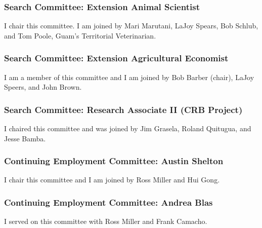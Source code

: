 \documentclass[12pt,english]{scrartcl}
\begin{document}
\subsubsection{Search Committee: Extension Animal Scientist}

I chair this committee. I am joined by Mari Marutani, LaJoy Spears,
Bob Schlub, and Tom Poole, Guam's Territorial Veterinarian.

\begin{comment}

\raggedright\vspace{2mm}\textbf{Activity}
\begin{itemize}
\item Position announcement written \cite{moore2018uoganimal} and advertisment
placed on the web site of the American Association of Animal Scientists
\cite{moore2018animalscientist}.
\end{itemize}

\end{comment}

\subsubsection{Search Committee: Extension Agricultural Economist}

I am a member of this committee and I am joined by Bob Barber (chair),
LaJoy Speers, and John Brown.

\subsubsection{Search Committee: Research Associate II (CRB Project)}

I chaired this committee and was joined by Jim Grasela, Roland Quitugua,
and Jesse Bamba.

\subsubsection{Continuing Employment Committee: Austin Shelton}

I chair this committee and I am joined by Ross Miller and Hui Gong.

\subsubsection{Continuing Employment Committee: Andrea Blas}

I served on this committee with Ross Miller and Frank Camacho.
\end{document}
